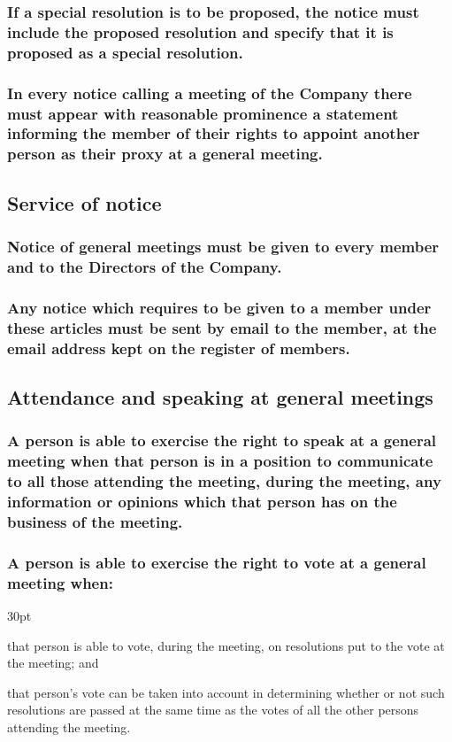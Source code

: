 \documentclass[12pt]{article}
\def\clauseindent{30pt}
\newenvironment{subindentpara}{\begin{adjustwidth}{\clauseindent}{}\begin{hanginglist}}{\end{hanginglist}\end{adjustwidth}}
\begin{document}
\subsubsection{If a special resolution is to be proposed, the notice must include the proposed resolution and specify that it is proposed as a special resolution.}
\subsubsection{In every notice calling a meeting of the Company there must appear with reasonable prominence a statement informing the member of their rights to appoint another person as their proxy at a general meeting.}

\subsection{Service of notice}
\subsubsection{Notice of general meetings must be given to every member and to the Directors of the Company.}
\subsubsection{Any notice which requires to be given to a member under these articles must be sent by email to the member, at the email address kept on the register of members.}

\subsection{Attendance and speaking at general meetings}
\subsubsection{A person is able to exercise the right to speak at a general meeting when that person is in a position to communicate to all those attending the meeting, during the meeting, any information or opinions which that person has on the business of the meeting.}
\subsubsection{A person is able to exercise the right to vote at a general meeting when:}
\begin{subindentpara}
    \item that person is able to vote, during the meeting, on resolutions put to the vote at the meeting; and
    \item that person's vote can be taken into account in determining whether or not such resolutions are passed at the same time as the votes of all the other persons attending the meeting.
\end{subindentpara}
\end{document}

